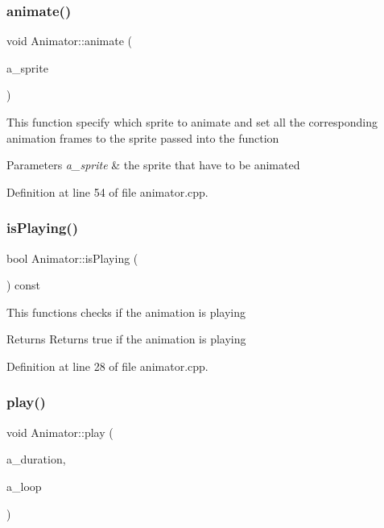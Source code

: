 \subsubsection{\texorpdfstring{animate()}{animate()}}
{\footnotesize\ttfamily void Animator\+::animate (\begin{DoxyParamCaption}\item[{sf\+::\+Sprite \&}]{a\+\_\+sprite }\end{DoxyParamCaption})}

This function specify which sprite to animate and set all the corresponding animation frames to the sprite passed into the function


\begin{DoxyParams}{Parameters}
{\em a\+\_\+sprite} & the sprite that have to be animated \\
\hline
\end{DoxyParams}


Definition at line 54 of file animator.\+cpp.

\mbox{\label{class_animator_af652cfa1671a9a8155f85b2b33f65a17}} 
\subsubsection{\texorpdfstring{is\+Playing()}{isPlaying()}}
{\footnotesize\ttfamily bool Animator\+::is\+Playing (\begin{DoxyParamCaption}{ }\end{DoxyParamCaption}) const}

This functions checks if the animation is playing

\begin{DoxyReturn}{Returns}
Returns true if the animation is playing 
\end{DoxyReturn}


Definition at line 28 of file animator.\+cpp.

\mbox{\label{class_animator_a8220e9ec75ce8e3425e8ca44c309f700}} 
\subsubsection{\texorpdfstring{play()}{play()}}
{\footnotesize\ttfamily void Animator\+::play (\begin{DoxyParamCaption}\item[{sf\+::\+Time}]{a\+\_\+duration,  }\item[{bool}]{a\+\_\+loop }\end{DoxyParamCaption})}

